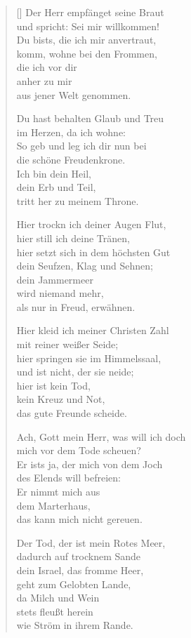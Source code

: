 \begin{multicols}{2}
\begin{verse}[\versewidth]
 Der Herr empfänget seine Braut\\
und spricht: Sei mir willkommen!\\
Du bists, die ich mir anvertraut,\\
komm, wohne bei den Frommen,\\
die ich vor dir\\
anher zu mir\\
aus jener Welt genommen.

 Du hast behalten Glaub und Treu\\
im Herzen, da ich wohne:\\
So geb und leg ich dir nun bei\\
die schöne Freudenkrone.\\
Ich bin dein Heil,\\
dein Erb und Teil,\\
tritt her zu meinem Throne.

 Hier trockn ich deiner Augen Flut,\\
hier still ich deine Tränen,\\
hier setzt sich in dem höchsten Gut\\
dein Seufzen, Klag und Sehnen;\\
dein Jammermeer\\
wird niemand mehr,\\
als nur in Freud, erwähnen.

 Hier kleid ich meiner Christen Zahl\\
mit reiner weißer Seide;\\
hier springen sie im Himmelssaal,\\
und ist nicht, der sie neide;\\
hier ist kein Tod,\\
kein Kreuz und Not,\\
das gute Freunde scheide.

 Ach, Gott mein Herr, was will ich doch\\
mich vor dem Tode scheuen?\\
Er ists ja, der mich von dem Joch\\
des Elends will befreien:\\
Er nimmt mich aus\\
dem Marterhaus,\\
das kann mich nicht gereuen.

 Der Tod, der ist mein Rotes Meer,\\
dadurch auf trocknem Sande\\
dein Israel, das fromme Heer,\\
geht zum Gelobten Lande,\\
da Milch und Wein\\
stets fleußt herein\\
wie Ström in ihrem Rande.


\end{verse}
\end{multicols}
